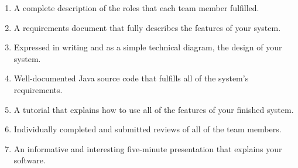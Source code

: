 \vspace*{-.1in}
\begin{enumerate}
  \setlength{\itemsep}{0in}
  \item A complete description of the roles that each team member fulfilled.
  \item A requirements document that fully describes the features of your system.
  \item Expressed in writing and as a simple technical diagram, the design of your system.
  \item Well-documented Java source code that fulfills all of the system's requirements.
  \item A tutorial that explains how to use all of the features of your finished system.
  \item Individually completed and submitted reviews of all of the team members.
  \item An informative and interesting five-minute presentation that explains your software.
\end{enumerate}
\vspace*{-.1in}


